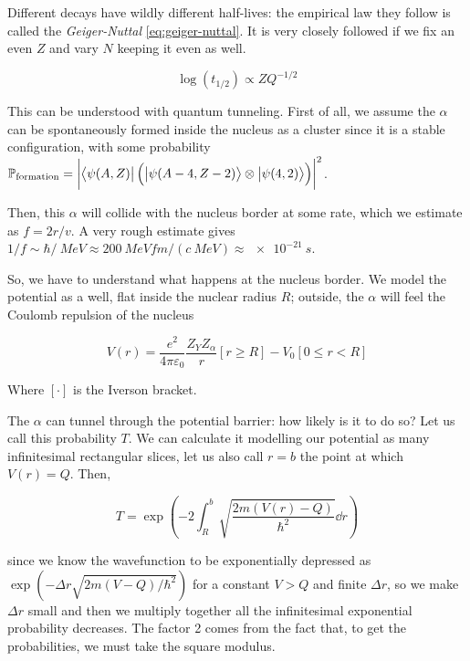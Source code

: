 \documentclass{article}
\begin{document}
Different decays have wildly different half-lives: the empirical law they follow is called the \emph{Geiger-Nuttal} \eqref{eq:geiger-nuttal}. It is very closely followed if we fix an even \(Z\) and vary \(N\) keeping it even as well.

\begin{equation} \label{eq:geiger-nuttal}
    \log(t_{1/2} ) \propto ZQ^{-1/2}
\end{equation}

This can be understood with quantum tunneling. First of all, we assume the \(\alpha\) can be spontaneously formed inside the nucleus as a cluster since it is a stable configuration, with some probability \(\mathbb{P} _ \text{formation} = \abs{\bra{\psi(A, Z)} \qty(\ket{\psi(A-4, Z-2)} \otimes \ket{\psi(4, 2)})}^2 \).

Then, this \(\alpha\) will collide with the nucleus border at some rate, which we estimate as \(f = 2 r / v\). A very rough estimate gives \(1/f \sim \hbar/\SI{}{MeV} \approx \SI{200}{MeVfm}/ (c\SI{}{MeV}) \approx \SI{e-21}{s} \).

So, we have to understand what happens at the nucleus border. We model the potential as a well, flat inside the nuclear radius \(R\); outside, the \(\alpha\) will feel the Coulomb repulsion of the nucleus

\begin{equation}
    V(r) = \frac{e^2}{4 \pi \varepsilon_0} \frac{Z_Y Z_\alpha}{r} [r \geq R] - V_0 [0 \leq r < R]
\end{equation}

Where \([\cdot]\) is the Iverson bracket.

The \(\alpha\) can tunnel through the potential barrier: how likely is it to do so? Let us call this probability \(T\). We can calculate it modelling our potential as many infinitesimal rectangular slices, let us also call \(r=b\) the point at which \(V(r) = Q\). Then,

\begin{equation}
    T = \exp(-2 \int _{R}   ^{b} \sqrt{\frac{2m(V(r) - Q)}{\hbar^2}}  \dd{r}  )
\end{equation}

since we know the wavefunction to be exponentially depressed as \(\exp(-\Delta r \sqrt{2m(V-Q)/\hbar^2} ) \) for a constant \(V>Q\) and finite \(\Delta r\), so we make \(\Delta r\) small and then we multiply together all the infinitesimal exponential probability decreases. The factor 2 comes from the fact that, to get the probabilities, we must take the square modulus.
\end{document}
